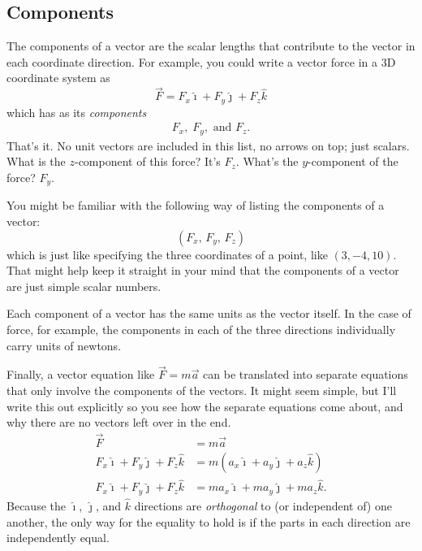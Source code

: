 \documentclass[10pt,letterpaper,twoside]{article}
\begin{document}
\subsection{Components}
The components of a vector are the scalar lengths that contribute to the vector in each coordinate direction.
For example, you could write a vector force in a 3D coordinate system as
$$\vec F = F_x\hat\imath + F_y\hat\jmath + F_z \hat k$$
which has as its \textit{components}
\begin{gather*}
  F_x, \; F_y,\text{ and } F_z.
\end{gather*}
That's it.
No unit vectors are included in this list, no arrows on top; just scalars.
What is the $z$-component of this force? It's $F_z$.
What's the $y$-component of the force? $F_y$.

You might be familiar with the following way of listing the components of a vector:
$$ \left(F_x,\,F_y,\,F_z\right) $$
which is just like specifying the three coordinates of a point, like $(3, -4, 10)$.
That might help keep it straight in your mind that the components of a vector are just simple scalar numbers.

Each component of a vector has the same units as the vector itself.
In the case of force, for example, the components in each of the three directions individually carry units of newtons.

Finally, a vector equation like $\vec F = m\vec a$ can be translated into separate equations that only involve the components of the vectors.
It might seem simple, but I'll write this out explicitly so you see how the separate equations come about, and why there are no vectors left over in the end.
\begin{align*}
  \vec F &= m\vec a \\
  F_x\hat\imath + F_y\hat\jmath + F_z\hat k &= m\left(a_x\hat\imath + a_y\hat\jmath + a_z\hat k \right) \\
  F_x\hat\imath + F_y\hat\jmath + F_z\hat k &= ma_x\hat\imath + ma_y\hat\jmath + ma_z\hat k.
\end{align*}
Because the $\hat\imath$, $\hat\jmath$, and $\hat k$ directions are \textit{orthogonal} to (or independent of) one another, the only way for the equality to hold is if the parts in each direction are independently equal.
\end{document}
